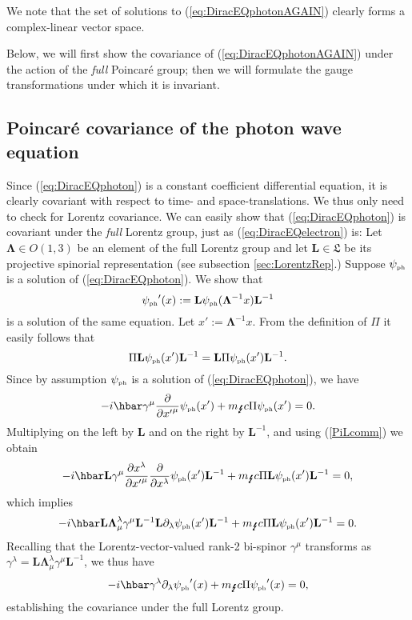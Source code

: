 \documentclass[11pt]{article}
\theoremstyle{definition}
\newcommand{\refeq}[1]{(\ref{#1})}
\numberwithin{equation}{section}
\newcommand{\bL}{\mathbf{L}}
\newcommand{\beq}{\begin{equation}}
\newcommand{\eeq}{\end{equation}}
\newcommand{\fL}{\mathfrak{L}}
\newcommand{\p}{\partial}
\newcommand{\bLa}{\boldsymbol{\Lambda}}
\newcommand{\psiPH}{{\psi_{\mbox{\rm\tiny ph}}}}
\newcommand{\mPH}{{m_{\mbox{\Lightning}}}}
\newcommand{\la}{\lambda}
\newcommand{\ga}{\gamma}
\begin{document}
 We note that the set of solutions to \refeq{eq:DiracEQphotonAGAIN} clearly forms a complex-linear vector space. 

Below, we will first show the covariance of \refeq{eq:DiracEQphotonAGAIN} under the action of the {\em full} Poincar\'e group; 
then we will formulate the gauge transformations under which it is invariant.

\subsection{Poincar\'e covariance of the photon wave equation}\label{sec:lorentzcov}
%

%
Since \refeq{eq:DiracEQphoton} is a constant coefficient differential equation, it is clearly covariant with respect to time- and space-translations.  We thus only need to check for Lorentz covariance.   We can easily show that  (\ref{eq:DiracEQphoton}) is covariant 
under the {\em full} Lorentz group, just as (\ref{eq:DiracEQelectron}) is:
 Let $\bLa \in O(1,3)$ be an element of the full Lorentz group and let $\bL \in \fL$ be its projective spinorial representation (see subsection \ref{sec:LorentzRep}.)
 Suppose $\psiPH$ is a solution of \refeq{eq:DiracEQphoton}.
 We show that
\beq 
\psiPH'(x) := \bL \psiPH( \bLa^{-1} x) \bL^{-1}
\eeq
is a solution of the same equation.  Let $x' := \bLa^{-1} x$.  
 From the definition of $\Pi$ it easily follows that
\beq 
\label{PiLcomm} 
\Pi \bL \psiPH(x')  \bL^{-1} = \bL \Pi \psiPH(x') \bL^{-1}.
\eeq
Since by assumption $\psiPH$ is a solution of (\ref{eq:DiracEQphoton}), we have
\beq 
 -i \hbar \ga^\mu \frac{\p}{\p {x'}^\mu} \psiPH(x') + \mPH c\Pi \psiPH(x') = 0.
\eeq
Multiplying on the left by $\bL$ and on the right by $\bL^{-1}$, and using \refeq{PiLcomm} we obtain
\beq 
-i\hbar \bL \ga^\mu \frac{\p x^\la}{\p {x'}^\mu} \frac{\p}{\p x^\la} \psiPH(x') \bL^{-1} + \mPH c \Pi \bL\psiPH(x')\bL^{-1} = 0,
\eeq
which implies
\beq 
-i \hbar \bL \bLa^\la_\mu \ga^\mu \bL^{-1}\bL \p_\la \psiPH(x') \bL^{-1} + \mPH c \Pi \bL\psiPH(x')\bL^{-1} = 0.
\eeq
Recalling that the Lorentz-vector-valued rank-2 bi-spinor $\ga^\mu$ transforms as $\ga^\la = \bL \bLa^\la_\mu \ga^\mu \bL^{-1}$, we thus have
\beq 
-i \hbar \ga^\la \p_\la \psiPH'(x) + \mPH c \Pi \psiPH'(x) = 0,
\eeq
establishing the covariance under the full Lorentz group.
%
\end{document}
